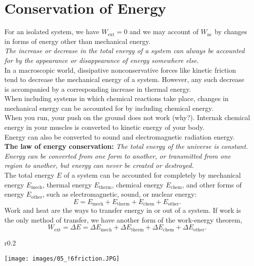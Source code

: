 \documentclass[11pt,a4paper]{report}
\begin{document}
\section{Conservation of Energy}
For an isolated system, we have $W_\mathrm{ext} = 0$ and we may account of $W_\mathrm{nc}$ by changes in forms of energy other than mechanical energy.
\\\textit{The increase or decrease in the total energy of a system can always be accounted for by the appearance or disappearance of energy somewhere else.}
\\In a macroscopic world, dissipative nonconservative forces like kinetic friction tend to decrease the mechanical energy of a system. However, any such decrease is accompanied by a corresponding increase in thermal energy.
\\When including systems in which chemical reactions take place, changes in mechanical energy can be accounted for by including chemical energy.
\\When you run, your push on the ground does not work (why?). Internak chemical energy in your muscles is converted to kinetic energy of your body.
\\Energy can also be converted to sound and electromagnetic radiation energy.
\\\textbf{The law of energy conservation:} \textit{The total energy of the universe is constant. Energy can be converted from one form to another, or transmitted from one region to another, but energy can never be created or destroyed.}
\\The total energy $E$ of a system can be accounted for completely by mechanical energy $E_\mathrm{mech}$, thermal energy $E_\mathrm{therm}$, chemical energy $E_\mathrm{chem}$, and other forms of energy $E_\mathrm{other}$, such as electromagnetic, sound, or nuclear energy: $$E = E_\mathrm{mech} + E_\mathrm{therm} + E_\mathrm{chem} + E_\mathrm{other}.$$
Work and heat are the ways to transfer energy in or out of a system. If work is the only method of transfer, we have another form of the work-energy theorem, $$W_\mathrm{ext} = \Delta{E} = \Delta{E_\mathrm{mech}} + \Delta{E_\mathrm{therm}} + \Delta{E_\mathrm{chem}} + \Delta{E_\mathrm{other}}.$$

\begin{wrapfigure}{r}{0.2\textwidth}
\begin{center}
\texttt{[image: images/05\_!6friction.JPG]}
\end{center}
\end{wrapfigure}
\end{document}
